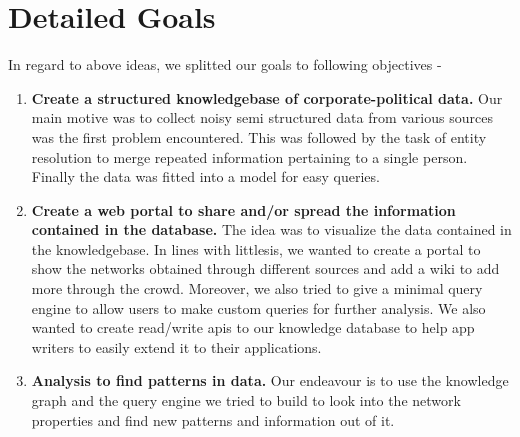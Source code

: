 \section{Detailed Goals}
In regard to above ideas, we splitted our goals to following objectives - 
\begin{enumerate}
    \item \textbf{Create a structured knowledgebase of corporate-political data.}
        Our main motive was to collect noisy semi structured data from various sources was the first problem encountered. This was followed by the task of entity resolution to merge repeated information pertaining to a single person. Finally the data was fitted into a model for easy queries.
    \item \textbf{Create a web portal to share and/or spread the information contained in the database.}
        The idea was to visualize the data contained in the knowledgebase. In lines with littlesis, we wanted to create a portal to show the networks obtained through different sources and add a wiki to add more through the crowd. Moreover, we also tried to give a minimal query engine to allow users to make custom queries for further analysis. We also wanted to create read/write apis to our knowledge database to help app writers to easily extend it to their applications.
    \item \textbf{Analysis to find patterns in data.}
        Our endeavour is to use the knowledge graph and the query engine we tried to build to look into the network properties and find new patterns and information out of it.

\end{enumerate}



%
%
